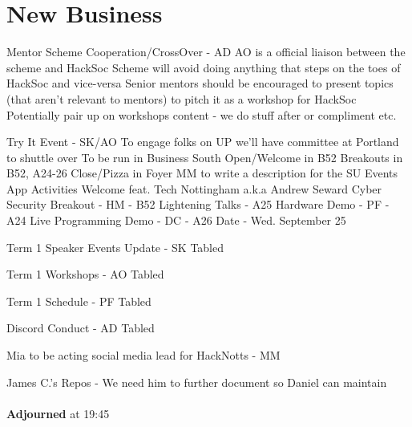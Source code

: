 \documentclass[11pt]{meetingmins}
\begin{document}
\section{New Business}
\begin{items}
	\item Mentor Scheme Cooperation/CrossOver - AD
		\subitem AO is a official liaison between the scheme and HackSoc
		\subitem Scheme will avoid doing anything that steps on the toes of HackSoc and vice-versa
		\subitem Senior mentors should be encouraged to present topics (that aren't relevant to mentors) to pitch it as a workshop for HackSoc
		\subitem Potentially pair up on workshops content - we do stuff after or compliment etc.
	\item Try It Event - SK/AO
		\subitem To engage folks on UP we'll have committee at Portland to shuttle over
		\subitem To be run in Business South
		\subitem Open/Welcome in B52
		\subitem Breakouts in B52, A24-26
		\subitem Close/Pizza in Foyer
		\subitem MM to write a description for the SU Events App
		\subitem Activities
			\subsubitem Welcome feat. Tech Nottingham a.k.a Andrew Seward
			\subsubitem Cyber Security Breakout - HM - B52
			\subsubitem Lightening Talks - A25
			\subsubitem Hardware Demo - PF - A24
			\subsubitem Live Programming Demo - DC - A26
		\subitem Date - Wed. September 25
	\item Term 1 Speaker Events Update - SK
		\subitem Tabled
	\item Term 1 Workshops - AO
		\subitem Tabled
	\item Term 1 Schedule - PF
		\subitem Tabled
	\item Discord Conduct - AD
		\subitem Tabled
	\item Mia to be acting social media lead for HackNotts - MM
	\item James C.'s Repos - We need him to further document so Daniel can maintain
	\\\\ \textbf{Adjourned} at 19:45
\end{items}

\vspace{1em}
\end{document}
